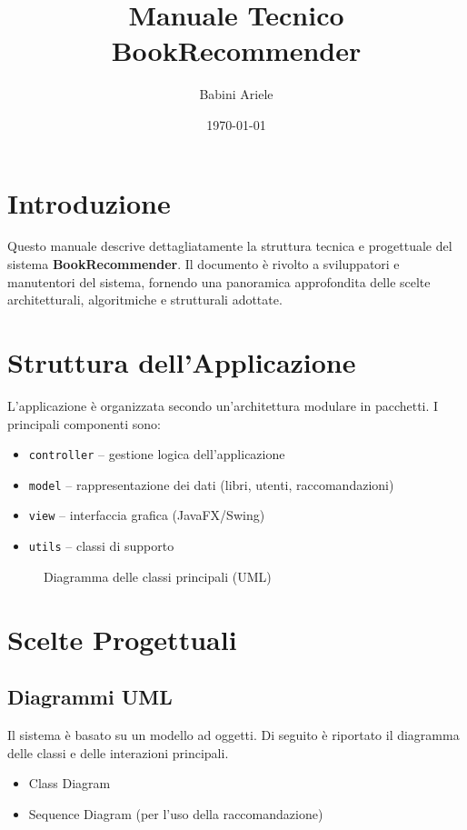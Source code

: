 \documentclass[a4paper,12pt]{article}
\title{Manuale Tecnico\\ \large BookRecommender}
\author{Babini Ariele}
\date{\today}
\begin{document}
    \maketitle
    \tableofcontents
    \newpage

    \section{Introduzione}
    Questo manuale descrive dettagliatamente la struttura tecnica e progettuale del sistema \textbf{BookRecommender}. Il documento è rivolto a sviluppatori e manutentori del sistema, fornendo una panoramica approfondita delle scelte architetturali, algoritmiche e strutturali adottate.

    \section{Struttura dell'Applicazione}
    L'applicazione è organizzata secondo un'architettura modulare in pacchetti. I principali componenti sono:
    \begin{itemize}
    \item \texttt{controller} – gestione logica dell'applicazione
    \item \texttt{model} – rappresentazione dei dati (libri, utenti, raccomandazioni)
    \item \texttt{view} – interfaccia grafica (JavaFX/Swing)
    \item \texttt{utils} – classi di supporto
    \end{itemize}

    \begin{figure}[h]
    \centering
    \fbox{\rule{0pt}{3cm} \rule{5cm}{0pt}} %
    \caption{Diagramma delle classi principali (UML)}
    \end{figure}

    \section{Scelte Progettuali}
    \subsection{Diagrammi UML}
    Il sistema è basato su un modello ad oggetti. Di seguito è riportato il diagramma delle classi e delle interazioni principali.
    \begin{itemize}
    \item Class Diagram
    \item Sequence Diagram (per l’uso della raccomandazione)
    \end{itemize}
\end{document}
